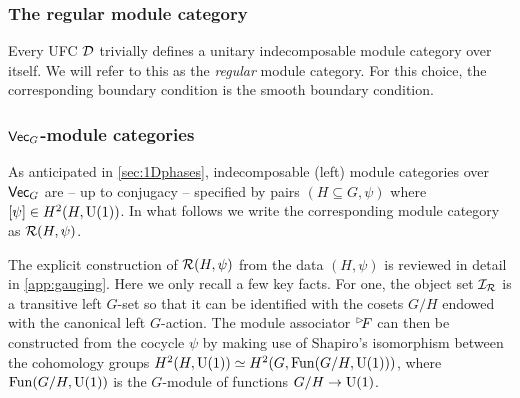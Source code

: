 \subsubsection{The regular module category}
Every UFC $\mathcal{D}$ trivially defines a unitary indecomposable module category over itself. We will refer to this as the \emph{regular} module category. For this choice, the corresponding boundary condition is the smooth boundary condition.
\subsubsection{$\mathsf{Vec}_G$-module categories}\label{par:VecGMods} As anticipated in \cref{sec:1Dphases}, indecomposable (left) module categories over $\mathsf{Vec}_G$ are -- up to conjugacy -- specified by pairs $(H\subseteq G,\psi)$ where $[\psi]\in H^2(H,{\rm U}(1))$. In what follows we write the corresponding module category as $\mathcal{R}(H, \psi)$.

The explicit construction of $\mathcal{R}(H, \psi)$ from the data $(H,\psi)$ is reviewed in detail in \cref{app:gauging}. Here we only recall a few key facts. For one, the object set $\mathcal{I}_{\mathcal{R}}$ is a transitive left $G$-set so that it can be identified with the cosets $G/H$ endowed with the canonical left $G$-action. The module associator ${}^{\rhd\!\!} F$ can then be constructed from the cocycle $\psi$ by making use of Shapiro's isomorphism between the cohomology groups $H^2(H,{\rm U}(1)) \simeq H^2(G,{\rm Fun}(G/H,{\rm U}(1)))$, where ${\rm Fun}(G/H,{\rm U}(1))$ is the $G$-module of functions $G/H\rightarrow {\rm U}(1)$.
%
%
%

